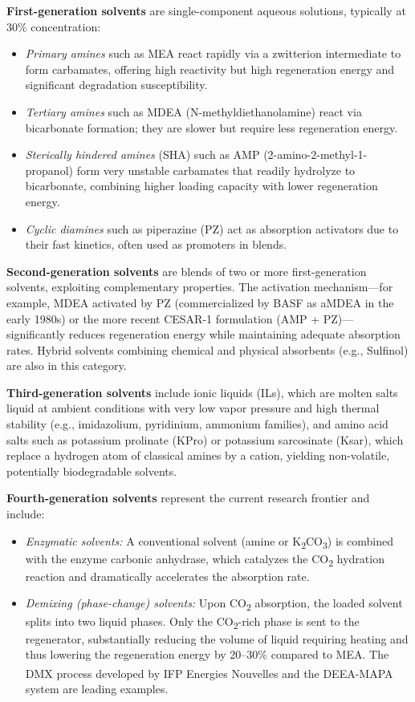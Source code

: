 \textbf{First-generation solvents} are single-component aqueous solutions, typically 
at 30\% concentration:
\begin{itemize}
    \item \textit{Primary amines} such as MEA react rapidly via a zwitterion intermediate 
    to form carbamates, offering high reactivity but high regeneration energy and 
    significant degradation susceptibility.
    \item \textit{Tertiary amines} such as MDEA (N-methyldiethanolamine) react via 
    bicarbonate formation; they are slower but require less regeneration energy.
    \item \textit{Sterically hindered amines} (SHA) such as AMP 
    (2-amino-2-methyl-1-propanol) form very unstable carbamates that readily hydrolyze 
    to bicarbonate, combining higher loading capacity with lower regeneration energy.
    \item \textit{Cyclic diamines} such as piperazine (PZ) act as absorption 
    activators due to their fast kinetics, often used as promoters in blends.
\end{itemize}

\textbf{Second-generation solvents} are blends of two or more first-generation 
solvents, exploiting complementary properties. The activation mechanism---for example, 
MDEA activated by PZ (commercialized by BASF as aMDEA in the early 1980s) or the 
more recent CESAR-1 formulation (AMP + PZ)---significantly reduces regeneration energy 
while maintaining adequate absorption rates. Hybrid solvents combining chemical and 
physical absorbents (e.g., Sulfinol) are also in this category.

\textbf{Third-generation solvents} include ionic liquids (ILs), which are molten salts 
liquid at ambient conditions with very low vapor pressure and high thermal stability 
(e.g., imidazolium, pyridinium, ammonium families), and amino acid salts such as 
potassium prolinate (KPro) or potassium sarcosinate (Ksar), which replace a hydrogen 
atom of classical amines by a cation, yielding non-volatile, potentially biodegradable 
solvents.

\textbf{Fourth-generation solvents} represent the current research frontier and include:
\begin{itemize}
    \item \textit{Enzymatic solvents:} A conventional solvent (amine or K\textsubscript{2}CO\textsubscript{3}) 
    is combined with the enzyme carbonic anhydrase, which catalyzes the CO\textsubscript{2} 
    hydration reaction and dramatically accelerates the absorption rate.
    \item \textit{Demixing (phase-change) solvents:} Upon CO\textsubscript{2} absorption, 
    the loaded solvent splits into two liquid phases. Only the CO\textsubscript{2}-rich 
    phase is sent to the regenerator, substantially reducing the volume of liquid 
    requiring heating and thus lowering the regeneration energy by 20--30\% compared 
    to MEA. The DMX\textsuperscript{\textregistered} process developed by IFP Energies 
    Nouvelles and the DEEA-MAPA system are leading examples.
\end{itemize}

